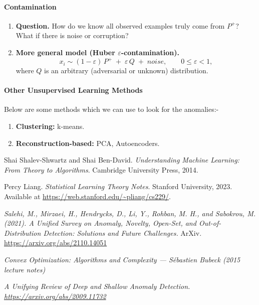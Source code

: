 \documentclass[11pt]{article}
\theoremstyle{plain}
\begin{document}
\paragraph{Contamination}
\begin{enumerate}
  \item \textbf{Question.} How do we know all observed examples truly come from $P^{+}$? What if there is noise or corruption?
  \item \textbf{More general model (Huber $\varepsilon$-contamination).}
  \[
    x_i \sim (1-\varepsilon)\,P^{+} \;+\; \varepsilon\,Q\;+\;noise,\qquad 0\le \varepsilon<1,
  \]
  where $Q$ is an arbitrary (adversarial or unknown) distribution.
\end{enumerate}

\paragraph{Other Unsupervised Learning Methods}
Below are some methods which we can use to look for the anomalies:-
\begin{enumerate}
  \item \textbf{Clustering:} k-means.
  \item \textbf{Reconstruction-based:} PCA, Autoencoders.
\end{enumerate}



\begin{thebibliography}{99}

Shai Shalev-Shwartz and Shai Ben-David.
\newblock \emph{Understanding Machine Learning: From Theory to Algorithms}.
\newblock Cambridge University Press, 2014.

Percy Liang.
\newblock \emph{Statistical Learning Theory Notes}.
\newblock Stanford University, 2023.
\newblock Available at \url{https://web.stanford.edu/~pliang/cs229/}.

\newblock \emph{Salehi, M., Mirzaei, H., Hendrycks, D., Li, Y., Rohban, M. H., and Sabokrou, M. (2021). A Unified Survey on Anomaly, Novelty, Open-Set, and Out-of-Distribution Detection: Solutions and Future Challenges.}
\newblock ArXiv. \url{https://arxiv.org/abs/2110.14051}

\newblock \emph{Convex Optimization: Algorithms and Complexity — Sébastien Bubeck (2015 lecture notes)}

\newblock \emph{A Unifying Review of Deep and Shallow Anomaly Detection. \url{https://arxiv.org/abs/2009.11732}}


\end{thebibliography}
\end{document}
